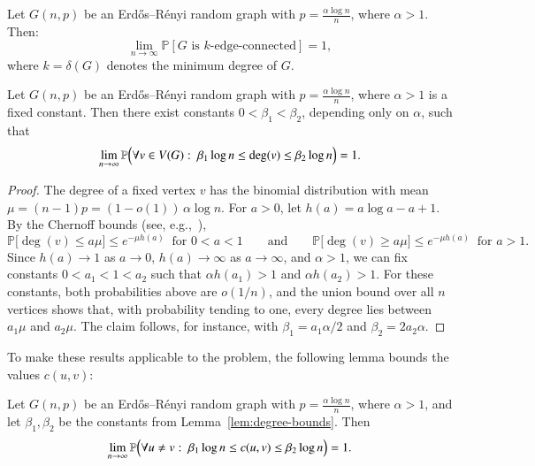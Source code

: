 \begin{theorem}
\label{thm:random-connectivity}
Let $G(n, p)$ be an Erdős–Rényi random graph with $p = \frac{\alpha \log n}{n}$, where $\alpha > 1$. Then:
\[
\lim_{n\to\infty} \mathbb{P}\left[ G \text{ is } k\text{-edge-connected} \right] = 1,
\]
where $k = \delta(G)$ denotes the minimum degree of $G$.
\end{theorem}



\begin{lemma}
\label{lem:degree-bounds}
Let $G(n, p)$ be an Erdős–Rényi random graph with $p = \frac{\alpha \log n}{n}$, where $\alpha > 1$ is a fixed constant.
Then there exist constants $0 < \beta_1 < \beta_2$, depending only on $\alpha$, such that
\[
\lim_{n\to\infty} \mathbb{P}\Bigl( \forall v \in V(G): \ \beta_1 \log n \leq \deg(v) \leq \beta_2 \log n \Bigr) = 1.
\]
\end{lemma}

\begin{proof}
The degree of a fixed vertex $v$ has the binomial distribution with mean $\mu = (n-1)p = (1-o(1))\,\alpha \log n$.
For $a > 0$, let $h(a) = a \log a - a + 1$.
By the Chernoff bounds (see, e.g.,~\cite{Frieze2016}),
\[
\mathbb{P}\bigl[\deg(v) \leq a\mu\bigr] \leq e^{-\mu h(a)} \ \text{ for } 0 < a < 1
\qquad\text{and}\qquad
\mathbb{P}\bigl[\deg(v) \geq a\mu\bigr] \leq e^{-\mu h(a)} \ \text{ for } a > 1.
\]
Since $h(a) \to 1$ as $a \to 0$, $h(a) \to \infty$ as $a \to \infty$, and $\alpha > 1$, we can fix constants $0 < a_1 < 1 < a_2$ such that $\alpha h(a_1) > 1$ and $\alpha h(a_2) > 1$.
For these constants, both probabilities above are $o(1/n)$, and the union bound over all $n$ vertices shows that, with probability tending to one, every degree lies between $a_1 \mu$ and $a_2 \mu$.
The claim follows, for instance, with $\beta_1 = a_1 \alpha / 2$ and $\beta_2 = 2 a_2 \alpha$.
\end{proof}


To make these results applicable to the \MinCutPath{} problem, the following lemma bounds the values $c(u,v)$:

\begin{lemma}
\label{lem:connectivity-bounds}
Let $G(n, p)$ be an Erdős–Rényi random graph with $p = \frac{\alpha \log n}{n}$, where $\alpha > 1$, and let $\beta_1, \beta_2$ be the constants from Lemma~\ref{lem:degree-bounds}.
Then
\[
\lim_{n\to\infty} \mathbb{P}\Bigl( \forall u \neq v: \ \beta_1 \log n \leq c(u,v) \leq \beta_2 \log n \Bigr) = 1.
\]
\end{lemma}


